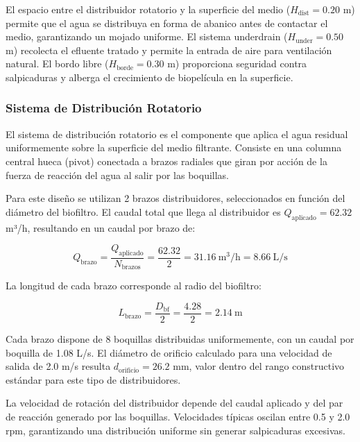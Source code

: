 \documentclass[12pt,a4paper]{article}
\begin{document}
El espacio entre el distribuidor rotatorio y la superficie del medio ($H_{\text{dist}} = 0.20$ m) permite que el agua se distribuya en forma de abanico antes de contactar el medio, garantizando un mojado uniforme. El sistema underdrain ($H_{\text{under}} = 0.50$ m) recolecta el efluente tratado y permite la entrada de aire para ventilación natural. El bordo libre ($H_{\text{borde}} = 0.30$ m) proporciona seguridad contra salpicaduras y alberga el crecimiento de biopelícula en la superficie.

\subsubsection*{Sistema de Distribución Rotatorio}

El sistema de distribución rotatorio es el componente que aplica el agua residual uniformemente sobre la superficie del medio filtrante. Consiste en una columna central hueca (pivot) conectada a brazos radiales que giran por acción de la fuerza de reacción del agua al salir por las boquillas.

Para este diseño se utilizan 2 brazos distribuidores, seleccionados en función del diámetro del biofiltro. El caudal total que llega al distribuidor es $Q_{\text{aplicado}} = 62.32$ m³/h, resultando en un caudal por brazo de:

\begin{equation}
Q_{\text{brazo}} = \frac{Q_{\text{aplicado}}}{N_{\text{brazos}}} = \frac{62.32}{2} = 31.16\ \text{m}^3\text{/h} = 8.66\ \text{L/s}
\end{equation}

La longitud de cada brazo corresponde al radio del biofiltro:

\begin{equation}
L_{\text{brazo}} = \frac{D_{\text{bf}}}{2} = \frac{4.28}{2} = 2.14\ \text{m}
\end{equation}

Cada brazo dispone de 8 boquillas distribuidas uniformemente, con un caudal por boquilla de 1.08 L/s. El diámetro de orificio calculado para una velocidad de salida de 2.0 m/s resulta $d_{\text{orificio}} = 26.2$ mm, valor dentro del rango constructivo estándar para este tipo de distribuidores.

La velocidad de rotación del distribuidor depende del caudal aplicado y del par de reacción generado por las boquillas. Velocidades típicas oscilan entre 0.5 y 2.0 rpm, garantizando una distribución uniforme sin generar salpicaduras excesivas.
\end{document}
